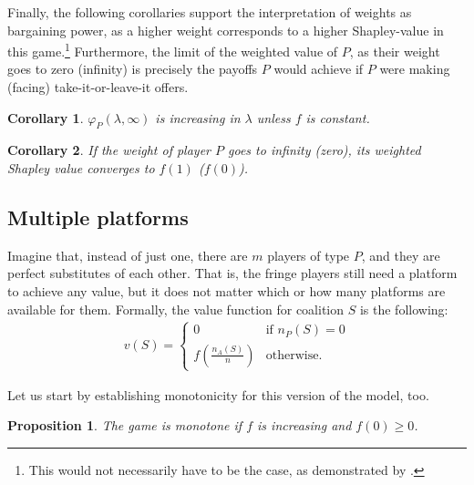 \documentclass[a4paper]{article}
\newtheorem{proposition}{Proposition}
\newtheorem{corollary}{Corollary}
\begin{document}
Finally, the following corollaries support the interpretation of weights as bargaining power, as a higher weight corresponds to a higher Shapley-value in this game.\footnote{This would not necessarily have to be the case, as demonstrated by \textcite{owen1968communications}.} Furthermore, the limit of the weighted value of $P$, as their weight goes to zero (infinity) is precisely the payoffs $P$ would achieve if $P$ were making (facing) take-it-or-leave-it offers.

\begin{corollary}
    \label{cor:platform_value_weighted}
    $\varphi_P(\lambda, \infty)$ is increasing in $\lambda$ unless $f$ is constant.
\end{corollary}

\begin{corollary}
    \label{cor:paltform_value_weighted_2}
    If the weight of player $P$ goes to infinity (zero), its weighted Shapley value converges to $f(1)$ ($f(0)$).
\end{corollary}

\subsection{Multiple platforms}

Imagine that, instead of just one, there are $m$ players of type $P$, and they are perfect substitutes of each other. That is, the fringe players still need a platform to achieve any value, but it does not matter which or how many platforms are available for them. Formally, the value function for coalition $S$ is the following:
\begin{align*}
    v(S) = \begin{cases}
        0                              & \text{if } n_P(S) = 0 \\
        f\left(\frac{n_A(S)}{n}\right) & \text{otherwise}.
    \end{cases}
\end{align*}

Let us start by establishing monotonicity for this version of the model, too.
\begin{proposition}
    The game is monotone if $f$ is increasing and $f(0) \geq 0$.
\end{proposition}
\end{document}
